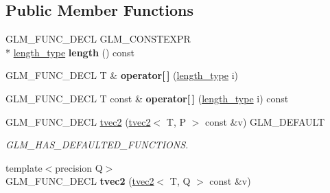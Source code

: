 \subsection*{Public Member Functions}
\begin{DoxyCompactItemize}
\item 
\hypertarget{structglm_1_1tvec2_acf1440d9b7f4eef7ec0f19f374ac2ab9}{G\-L\-M\-\_\-\-F\-U\-N\-C\-\_\-\-D\-E\-C\-L G\-L\-M\-\_\-\-C\-O\-N\-S\-T\-E\-X\-P\-R \\*
\hyperlink{structglm_1_1tvec2_a5a5ddebab821a3cf9185772386afbe8d}{length\-\_\-type} {\bfseries length} () const }\label{structglm_1_1tvec2_acf1440d9b7f4eef7ec0f19f374ac2ab9}

\item 
\hypertarget{structglm_1_1tvec2_a70383ca2702ecf4d4ff41063de68594d}{G\-L\-M\-\_\-\-F\-U\-N\-C\-\_\-\-D\-E\-C\-L T \& {\bfseries operator\mbox{[}$\,$\mbox{]}} (\hyperlink{structglm_1_1tvec2_a5a5ddebab821a3cf9185772386afbe8d}{length\-\_\-type} i)}\label{structglm_1_1tvec2_a70383ca2702ecf4d4ff41063de68594d}

\item 
\hypertarget{structglm_1_1tvec2_af1b26940fc1906b98d7e4c6c52b89c7f}{G\-L\-M\-\_\-\-F\-U\-N\-C\-\_\-\-D\-E\-C\-L T const \& {\bfseries operator\mbox{[}$\,$\mbox{]}} (\hyperlink{structglm_1_1tvec2_a5a5ddebab821a3cf9185772386afbe8d}{length\-\_\-type} i) const }\label{structglm_1_1tvec2_af1b26940fc1906b98d7e4c6c52b89c7f}

\item 
\hypertarget{structglm_1_1tvec2_adb922a5f30ed67dcd978dad9ba4914dc}{G\-L\-M\-\_\-\-F\-U\-N\-C\-\_\-\-D\-E\-C\-L \hyperlink{structglm_1_1tvec2_adb922a5f30ed67dcd978dad9ba4914dc}{tvec2} (\hyperlink{structglm_1_1tvec2}{tvec2}$<$ T, P $>$ const \&v) G\-L\-M\-\_\-\-D\-E\-F\-A\-U\-L\-T}\label{structglm_1_1tvec2_adb922a5f30ed67dcd978dad9ba4914dc}

\begin{DoxyCompactList}\small\item\em G\-L\-M\-\_\-\-H\-A\-S\-\_\-\-D\-E\-F\-A\-U\-L\-T\-E\-D\-\_\-\-F\-U\-N\-C\-T\-I\-O\-N\-S. \end{DoxyCompactList}\item 
\hypertarget{structglm_1_1tvec2_ade6d19296f50987189652f86decc793a}{{\footnotesize template$<$precision Q$>$ }\\G\-L\-M\-\_\-\-F\-U\-N\-C\-\_\-\-D\-E\-C\-L {\bfseries tvec2} (\hyperlink{structglm_1_1tvec2}{tvec2}$<$ T, Q $>$ const \&v)}\label{structglm_1_1tvec2_ade6d19296f50987189652f86decc793a}


\end{DoxyCompactItemize}
